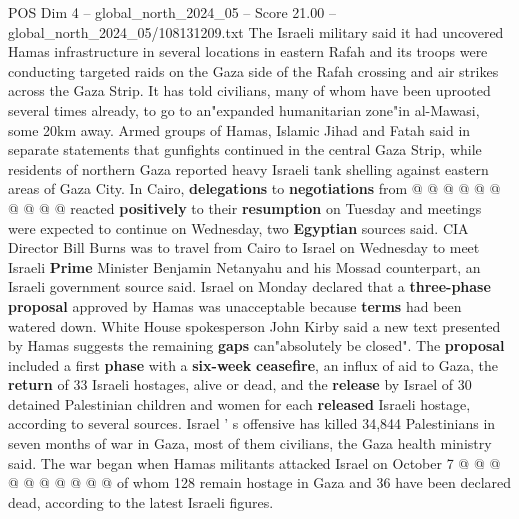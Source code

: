 \begin{textsample}{POS Dim 4 – global\_north\_2024\_05 – Score 21.00 – global\_north\_2024\_05/108131209.txt}
The Israeli military said it had uncovered Hamas infrastructure in several locations in eastern Rafah and its troops were conducting targeted raids on the Gaza side of the Rafah crossing and air strikes across the Gaza Strip.
It has told civilians, many of whom have been uprooted several times already, to go to an"expanded humanitarian zone"in al-Mawasi, some 20km away.
Armed groups of Hamas, Islamic Jihad and Fatah said in separate statements that gunfights continued in the central Gaza Strip, while residents of northern Gaza reported heavy Israeli tank shelling against eastern areas of Gaza City.
In Cairo, \textbf{delegations} to \textbf{negotiations} from @ @ @ @ @ @ @ @ @ @ reacted \textbf{positively} to their \textbf{resumption} on Tuesday and meetings were expected to continue on Wednesday, two \textbf{Egyptian} sources said.
CIA Director Bill Burns was to travel from Cairo to Israel on Wednesday to meet Israeli \textbf{Prime} Minister Benjamin Netanyahu and his Mossad counterpart, an Israeli government source said.
Israel on Monday declared that a \textbf{three-phase} \textbf{proposal} approved by Hamas was unacceptable because \textbf{terms} had been watered down.
White House spokesperson John Kirby said a new text presented by Hamas suggests the remaining \textbf{gaps} can"absolutely be closed".
The \textbf{proposal} included a first \textbf{phase} with a \textbf{six-week} \textbf{ceasefire}, an influx of aid to Gaza, the \textbf{return} of 33 Israeli hostages, alive or dead, and the \textbf{release} by Israel of 30 detained Palestinian children and women for each \textbf{released} Israeli hostage, according to several sources.
Israel ' s offensive has killed 34,844 Palestinians in seven months of war in Gaza, most of them civilians, the Gaza health ministry said.
The war began when Hamas militants attacked Israel on October 7 @ @ @ @ @ @ @ @ @ @ of whom 128 remain hostage in Gaza and 36 have been declared dead, according to the latest Israeli figures.

\end{textsample}
